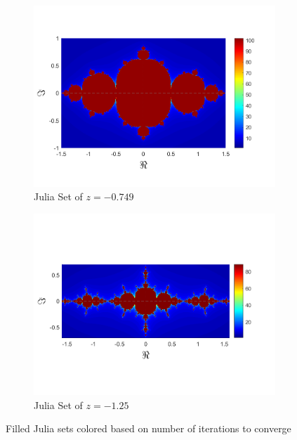 \documentclass[letterpaper,11pt]{article}
\begin{document}
\begin{figure}
	\begin{subfigure}[b]{0.49\textwidth}
		\includegraphics[width=\textwidth]{../Figures/ColoredJulia3.png}
		\caption{Julia Set of $z = - 0.749$}
		\label{fig:CJ-.749}
	\end{subfigure}
	\begin{subfigure}[b]{0.49\textwidth}
		\includegraphics[width=\textwidth]{../Figures/ColoredJulia4.png}
		\caption{Julia Set of $z = -1.25$}
		\label{fig:CJ-1.25}
	\end{subfigure}
	\caption{Filled Julia sets colored based on number of iterations to converge}
	\label{fig:CJwithC}
\end{figure}
\end{document}
